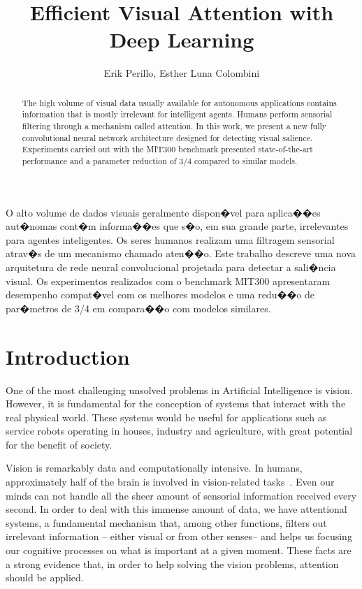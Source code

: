 \documentclass[12pt]{article}
\title{Efficient Visual Attention with Deep Learning}
\author{Erik Perillo\inst{1}, Esther Luna Colombini\inst{1}}
\begin{document}
\maketitle

\begin{abstract}
The high volume of visual data usually available for autonomous applications contains information that is
mostly irrelevant for intelligent agents. Humans perform sensorial filtering through a mechanism called attention. In this work, we present a new fully convolutional neural network architecture designed for detecting visual salience. Experiments carried out with the MIT300 benchmark presented state-of-the-art performance and a parameter reduction of 3/4 compared to similar models.
\end{abstract}

\begin{resumo}
O alto volume de dados visuais geralmente dispon�vel para aplica��es aut�nomas cont�m informa��es que s�o, em sua grande parte,  irrelevantes para agentes inteligentes. Os seres humanos realizam uma filtragem sensorial atrav�s de um mecanismo chamado aten��o. Este trabalho descreve uma nova arquitetura de rede neural convolucional projetada para detectar a sali�ncia visual. Os experimentos realizados com o benchmark MIT300 apresentaram desempenho compat�vel com os melhores modelos e uma redu��o de par�metros de 3/4 em compara��o com modelos similares.
\end{resumo}

\section{Introduction}
One of the most challenging unsolved problems in Artificial Intelligence is vision.
However, it is fundamental for the conception of systems that interact with the real
physical world. These systems would be useful for applications such as service
robots operating in houses, industry and agriculture, with great potential for the benefit of society.

Vision is remarkably data and computationally intensive.
In humans, approximately half of the brain is involved in
vision-related tasks~\cite{fixott_1957}.
Even our minds can not handle all the sheer amount of sensorial information
received every second. In order to deal with this immense amount of data, we have attentional systems, a fundamental mechanism
that, among other functions, filters out irrelevant information
-- either visual or from other senses-- and helps us focusing our cognitive
processes on what is important at a given moment.
These facts are a strong evidence that, in order to help solving the
vision problems, attention should be applied.
\end{document}
